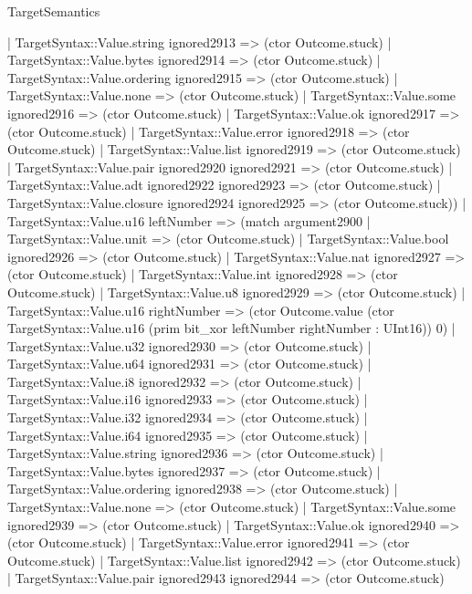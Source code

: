 \begin{lexlean}{TargetSemantics}
\begin{semanticmodule}
{              | TargetSyntax::Value.string ignored2913 => (ctor Outcome.stuck)
              | TargetSyntax::Value.bytes ignored2914 => (ctor Outcome.stuck)
              | TargetSyntax::Value.ordering ignored2915 => (ctor Outcome.stuck)
              | TargetSyntax::Value.none => (ctor Outcome.stuck)
              | TargetSyntax::Value.some ignored2916 => (ctor Outcome.stuck)
              | TargetSyntax::Value.ok ignored2917 => (ctor Outcome.stuck)
              | TargetSyntax::Value.error ignored2918 => (ctor Outcome.stuck)
              | TargetSyntax::Value.list ignored2919 => (ctor Outcome.stuck)
              | TargetSyntax::Value.pair ignored2920 ignored2921 => (ctor Outcome.stuck)
              | TargetSyntax::Value.adt ignored2922 ignored2923 => (ctor Outcome.stuck)
              | TargetSyntax::Value.closure ignored2924 ignored2925 => (ctor Outcome.stuck))
            | TargetSyntax::Value.u16 leftNumber => (match argument2900
              | TargetSyntax::Value.unit => (ctor Outcome.stuck)
              | TargetSyntax::Value.bool ignored2926 => (ctor Outcome.stuck)
              | TargetSyntax::Value.nat ignored2927 => (ctor Outcome.stuck)
              | TargetSyntax::Value.int ignored2928 => (ctor Outcome.stuck)
              | TargetSyntax::Value.u8 ignored2929 => (ctor Outcome.stuck)
              | TargetSyntax::Value.u16 rightNumber => (ctor Outcome.value (ctor TargetSyntax::Value.u16 (prim bit_xor leftNumber rightNumber : UInt16)) 0)
              | TargetSyntax::Value.u32 ignored2930 => (ctor Outcome.stuck)
              | TargetSyntax::Value.u64 ignored2931 => (ctor Outcome.stuck)
              | TargetSyntax::Value.i8 ignored2932 => (ctor Outcome.stuck)
              | TargetSyntax::Value.i16 ignored2933 => (ctor Outcome.stuck)
              | TargetSyntax::Value.i32 ignored2934 => (ctor Outcome.stuck)
              | TargetSyntax::Value.i64 ignored2935 => (ctor Outcome.stuck)
              | TargetSyntax::Value.string ignored2936 => (ctor Outcome.stuck)
              | TargetSyntax::Value.bytes ignored2937 => (ctor Outcome.stuck)
              | TargetSyntax::Value.ordering ignored2938 => (ctor Outcome.stuck)
              | TargetSyntax::Value.none => (ctor Outcome.stuck)
              | TargetSyntax::Value.some ignored2939 => (ctor Outcome.stuck)
              | TargetSyntax::Value.ok ignored2940 => (ctor Outcome.stuck)
              | TargetSyntax::Value.error ignored2941 => (ctor Outcome.stuck)
              | TargetSyntax::Value.list ignored2942 => (ctor Outcome.stuck)
              | TargetSyntax::Value.pair ignored2943 ignored2944 => (ctor Outcome.stuck)
}
\end{semanticmodule}
\end{lexlean}
